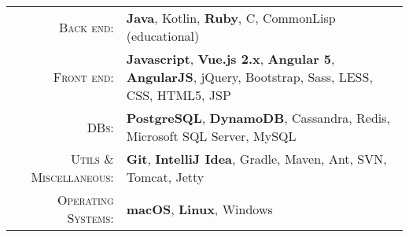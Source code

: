%
%
%

\renewcommand{\arraystretch}{1.1}

	\begin{tabular}{>{}r>{}p{13cm}} 
		\textsc{Back end:} &
			\textbf{Java}, Kotlin, \textbf{Ruby}, C, CommonLisp (educational) \\
		\textsc{Front end:} &
			\textbf{Javascript}, \textbf{Vue.js 2.x}, \textbf{Angular 5}, \textbf{AngularJS}, jQuery, Bootstrap, Sass, LESS, CSS, HTML5, JSP \\ 
		\textsc{DBs:} & 
			\textbf{PostgreSQL}, \textbf{DynamoDB}, Cassandra, Redis, Microsoft SQL Server, MySQL \\ 
		\textsc{Utils \& Miscellaneous:} &
			\textbf{Git}, \textbf{IntelliJ Idea}, Gradle, Maven, Ant, SVN, Tomcat, Jetty \\
		\textsc{Operating Systems:} &
			\textbf{macOS}, \textbf{Linux}, Windows \\ 
	\end{tabular}
